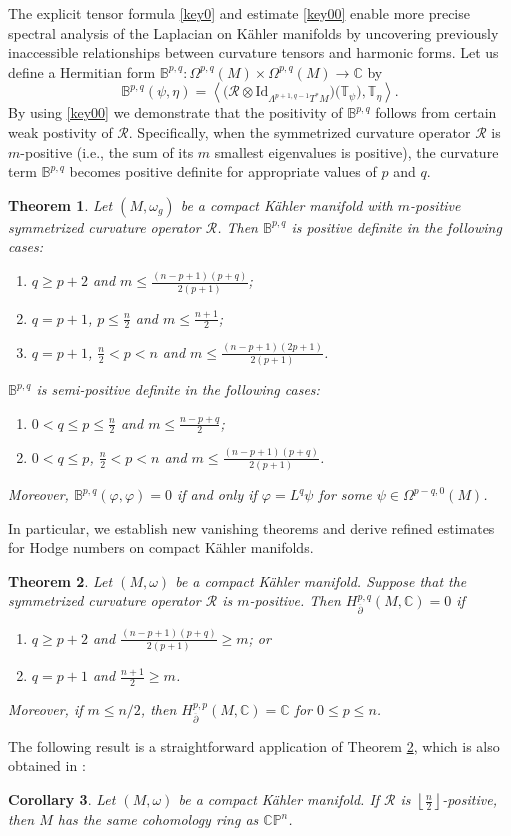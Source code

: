 \documentclass[12pt, reqno]{amsart}
\theoremstyle{plain}
\newtheorem{thm}{Theorem}[section]
\newtheorem{cor}[thm]{Corollary}
\theoremstyle{definition}
\newcommand{\btheorem}{\begin{thm}}
\newcommand{\etheorem}{\end{thm}}
\newcommand{\bcorollary}{\begin{cor}}
\newcommand{\ecorollary}{\end{cor}}
\newcommand{\p}{\partial}
\renewcommand{\bar}{\overline}
\renewcommand{\phi}{\varphi}
\newcommand{\beq}{\begin{equation}}
\newcommand{\eeq}{\end{equation}}
\newcommand{\bd}{\begin{enumerate}}
\newcommand{\ed}{\end{enumerate}}
\renewcommand{\>}{\rightarrow}
\newcommand{\C}{{\mathbb C}}
\renewcommand{\P}{{\mathbb P}}
\renewcommand{\#}{\sharp}
\numberwithin{equation}{section} %
\begin{document}
    \noindent The explicit tensor formula \eqref{key0} and estimate \eqref{key00} enable more precise spectral analysis of the Laplacian on K\"ahler manifolds by uncovering previously inaccessible relationships between curvature tensors and harmonic forms. Let us define a Hermitian form $ \mathbb{B}^{p,q}: \Omega^{p,q}(M) \times \Omega^{p,q}(M) \> \mathbb{C} $ by
    \beq \mathbb{B}^{p,q}(\psi,\eta) = \left\langle \big(\mathcal{R}\otimes \mathrm{Id}_{\Lambda^{p+1,q-1}T^*M}\big)\big(\mathbb{T}_{\psi}\big),\mathbb{T}_{\eta} \right\rangle. \eeq
    By using \eqref{key00} we demonstrate that the positivity of   $ \mathbb{B}^{p,q} $ follows from certain  weak postivity of $ \mathcal{R} $. Specifically, when the symmetrized curvature operator $\mathcal{R}$ is $m$-positive (i.e., the sum of its $m$ smallest eigenvalues is positive), the curvature term $ \mathbb{B}^{p,q} $ becomes positive definite for appropriate values of $p$ and $q$.


    \btheorem
    \label{positivityofBpq} Let  $(M,\omega_g)$ be a compact K\"ahler manifold with
$m$-positive symmetrized curvature operator $ \mathcal{R} $.  Then $ \mathbb{B}^{p,q} $ is positive definite in the following cases:
    \bd
    \item $ q \geq p + 2 $ and $ m \leq \frac{(n-p+1)(p+q)}{2(p+1)}$;
    \item $ q = p + 1 $,  $p \leq \frac{n}{2} $ and $ m\leq \frac{n+1}{2} $;
    \item  $ q = p + 1 $,  $ \frac{n}{2}<p<n $ and $ m\leq \frac{(n-p+1)(2p+1)}{2(p+1)} $.
    \ed
    $ \mathbb{B}^{p,q} $ is semi-positive definite in the following cases:
    \bd
    \item  $0< q \leq p  \leq \frac{n}{2} $ and $ m \leq \frac{n-p+q}{2} $;
    \item  $ 0<q \leq p $, $ \frac{n}{2}<p<n $ and $ m \leq \frac{(n-p+1)(p+q)}{2(p+1)} $.
    \ed
    Moreover, $ \mathbb{B}^{p,q}(\phi,\phi) = 0 $ if and only if $ \phi = L^q\psi $ for some $ \psi \in \Omega^{p-q,0}(M) $.
    \etheorem


    \noindent  In particular, we establish new vanishing theorems and derive refined estimates for Hodge numbers on compact K\"ahler manifolds.






\btheorem\label{main5} Let $ (M,\omega) $ be a compact K\"ahler manifold. Suppose that  the symmetrized curvature operator $ \mathcal{R} $ is $ m $-positive. Then $ H_{\bar\p}^{p,q}(M,\mathbb{C}) = 0 $ if
\bd
\item  $ q \geq p + 2 $ and $   \frac{(n-p+1)(p+q)}{2(p+1)}\geq m$; or
\item $ q = p + 1 $ and $  \frac{n+1}{2}\geq m $.
\ed
Moreover, if  $m\leq n/2$, then $ H_{\bar\p}^{p,p}(M,\mathbb{C}) = \C $ for $0\leq p\leq n$.
\etheorem
\noindent The following result is a straightforward application of Theorem \ref{main5}, which is also obtained in \cite{BNPSW25}:
    \bcorollary\label{cohomologicalspace}  Let $ (M,\omega) $ be a compact K\"ahler manifold.  If $ \mathcal{R} $ is $\left\lfloor \frac{n}{2}\right\rfloor$-positive, then $M$ has the same cohomology ring as $\C\P^n$.
    \ecorollary
\end{document}
